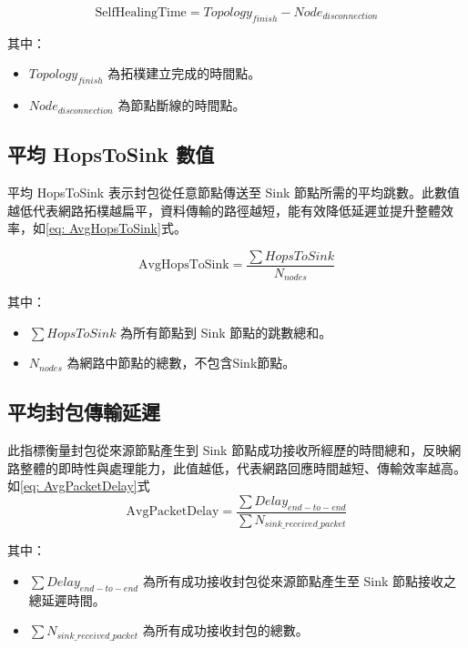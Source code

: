 \begin{ZhChapter}
\begin{equation}
\label{eq: SelfHealingTime}
\text{SelfHealingTime} = Topology_{finish} - Node_{disconnection}
\end{equation}

其中：
\begin{itemize}
    \item $Topology_{finish}$ 為拓樸建立完成的時間點。
    \item $Node_{disconnection}$ 為節點斷線的時間點。
\end{itemize}

\subsection{平均 HopsToSink 數值}
平均 HopsToSink 表示封包從任意節點傳送至 Sink 節點所需的平均跳數。此數值越低代表網路拓樸越扁平，資料傳輸的路徑越短，能有效降低延遲並提升整體效率，如\ref{eq: AvgHopsToSink}式。

\begin{equation}
\label{eq: AvgHopsToSink}
\text{AvgHopsToSink} = \frac{\sum HopsToSink}{N_{nodes}}
\end{equation}

其中：
\begin{itemize}
    \item $\sum HopsToSink$ 為所有節點到 Sink 節點的跳數總和。
    \item $N_{nodes}$ 為網路中節點的總數，不包含Sink節點。
\end{itemize}

\subsection{平均封包傳輸延遲}
此指標衡量封包從來源節點產生到 Sink 節點成功接收所經歷的時間總和，反映網路整體的即時性與處理能力，此值越低，代表網路回應時間越短、傳輸效率越高。如\ref{eq: AvgPacketDelay}式
\begin{equation}
\label{eq: AvgPacketDelay}
\text{AvgPacketDelay} = \frac{\sum Delay_{end-to-end}}{\sum N_{sink\_received\_packet}}
\end{equation}

其中：
\begin{itemize}
    \item $\sum Delay_{end-to-end}$ 為所有成功接收封包從來源節點產生至 Sink 節點接收之總延遲時間。
    \item $\sum N_{sink\_received\_packet}$ 為所有成功接收封包的總數。
\end{itemize}


\end{ZhChapter}

